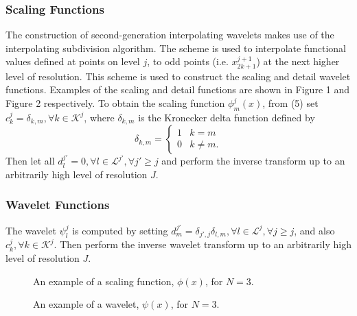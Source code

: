 \documentclass[11pt]{article}
\begin{document}
\subsubsection{Scaling Functions}
The construction of second-generation interpolating wavelets makes use of the interpolating subdivision algorithm. 
The scheme is used to interpolate functional values defined at points on level $j$, to odd points (i.e. $x_{2k+1}^{j+1}$) 
at the next higher level of resolution. This scheme is used to construct the scaling and detail wavelet functions. 
Examples of the scaling and detail functions are shown in Figure 1 and Figure 2 respectively.
To obtain the scaling function $\phi_{m}^{j}(x)$, from (5) set $c_{k}^{j}=\delta_{k,m}, \forall k \in \mathcal{K}^j$, where $\delta_{k,m}$ is the Kronecker delta function defined by
\[ \delta_{k,m} = \begin{cases} 
      1 & k=m \\
      0 & k \neq m.
   \end{cases}
\]
Then let all $d_{l}^{j'}=0, \forall l \in \mathcal{L}^{j'}, \forall j' \geq j$ and perform the inverse transform up to an arbitrarily high level of resolution $J$. 
\subsubsection{Wavelet Functions}
The wavelet $\psi_{l}^{j}$ is computed by setting $d_{m}^{j'} = \delta_{j',j} \delta_{l,m}, \forall l \in \mathcal{L}^{j}, \forall j \geq j$, 
and also $c_{k}^{j}, \forall k \in \mathcal{K}^j$. Then perform the inverse wavelet transform up to an arbitrarily high level of resolution $J$.
\begin{figure}
	\center
	
	\caption{An example of a scaling function, $\phi(x)$, for $N=3$.}
\end{figure}
\begin{figure}
	\center
	
	\caption{An example of a wavelet, $\psi(x)$, for $N=3$.}
\end{figure}

\end{document}
